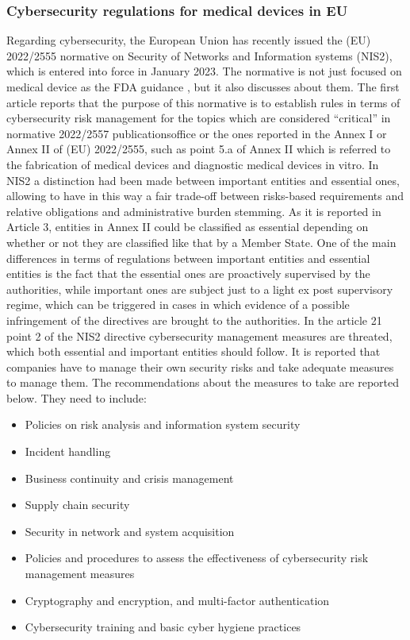 \documentclass{Configuration_Files/PoliMi3i_thesis}
\begin{document}
\subsubsection{Cybersecurity regulations for medical devices in EU} 
Regarding cybersecurity, the European Union has recently issued the (EU) 2022/2555 \cite{DirectiveEU20222022} normative on Security of Networks and Information systems (NIS2), which is entered into force in January 2023. 
The normative is not just focused on medical device as the FDA guidance \cite{ContentPremarketSubmissions}, but it also discusses about them. The first article reports that the purpose of this normative is to establish rules in terms of cybersecurity risk management for the topics which are considered “critical” in normative 2022/2557 \cite{} publicationsoffice or the ones reported in the Annex I or Annex II of (EU) 2022/2555, such as point 5.a of Annex II which is referred to the fabrication of medical devices and diagnostic medical devices in vitro. 
In NIS2 a distinction had been made between important entities and essential ones, allowing to have in this way a fair trade-off between risks-based requirements and relative obligations and administrative burden stemming. As it is reported in Article 3, entities in Annex II could be classified as essential depending on whether or not they are classified like that by a Member State.
One of the main differences in terms of regulations between important entities and essential entities is the fact that the essential ones are proactively supervised by the authorities, while important ones are subject just to a light ex post supervisory regime, which can be triggered in cases in which evidence of a possible infringement of the directives are brought to the authorities.
In the article 21 point 2 of the NIS2 directive cybersecurity management measures are threated, which both essential and important entities should follow. It is reported that companies have to manage their own security risks and take adequate measures to manage them. 
The recommendations about the measures to take are reported below. They need to include:
\begin{itemize}
	\item Policies on risk analysis and information system security 
	\item Incident handling
	\item Business continuity and crisis management
	\item Supply chain security
	\item Security in network and system acquisition
	\item Policies and procedures to assess the effectiveness of cybersecurity risk management measures
	\item Cryptography and encryption, and multi-factor authentication
	\item Cybersecurity training and basic cyber hygiene practices
\end{itemize}
\end{document}
